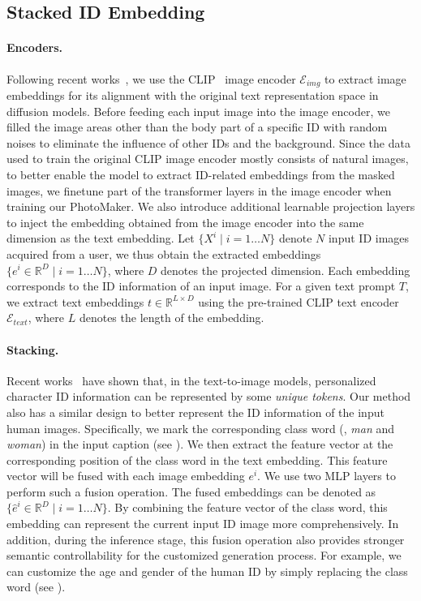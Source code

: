 \subsection{Stacked ID Embedding}
\label{sec:embedding}
\paragraph{Encoders.} 
Following recent works~\cite{jia2023taming, wei2023elite, shi2023instantbooth}, we use the CLIP~\cite{radford2021learning} image encoder $\mathcal{E}_{img}$ to extract image embeddings for its alignment with the original text representation space in diffusion models.
Before feeding each input image into the image encoder, we filled the image areas other than the body part of a specific ID with random noises to eliminate the influence of other IDs and the background.
Since the data used to train the original CLIP image encoder mostly consists of natural images, to better enable the model to extract ID-related embeddings from the masked images, we finetune part of the transformer layers in the image encoder when training our PhotoMaker.
We also introduce additional learnable projection layers to inject the embedding obtained from the image encoder into the same dimension as the text embedding.
Let $\{X^{i}  \mid i=1 \dots N\}$ denote $N$ input ID images acquired from a user,
we thus obtain the extracted embeddings $\{e^{i} \in \mathbb{R}^{D} \mid i=1 \dots N\}$, where $D$ denotes the projected dimension.
Each embedding corresponds to the ID information of an input image.
For a given text prompt $T$, we extract text embeddings $ t \in \mathbb{R}^{L \times D} $ using the pre-trained CLIP text encoder $\mathcal{E}_{text}$, where $L$ denotes the length of the embedding.

\paragraph{Stacking.} 
Recent works~\cite{ruiz2022dreambooth, gal2022image, xiao2023fastcomposer} have shown that, in the text-to-image models, personalized character ID information can be represented by some \textit{unique tokens}. 
Our method also has a similar design to better represent the ID information of the input human images. 
Specifically, we mark the corresponding class word (\eg, \textit{man} and \textit{woman}) in the input caption (see ).
We then extract the feature vector at the corresponding position of the class word in the text embedding.
This feature vector will be fused with each image embedding $e^{i}$.
We use two MLP layers to perform such a fusion operation.
The fused embeddings can be denoted as $\{\hat{e}^{i} \in \mathbb{R}^{D} \mid i=1 \dots N\}$.
By combining the feature vector of the class word, this embedding can represent the current input ID image more comprehensively.
In addition, during the inference stage, this fusion operation also provides stronger semantic controllability for the customized generation process. For example, we can customize the age and gender of the human ID by simply replacing the class word (see ).

